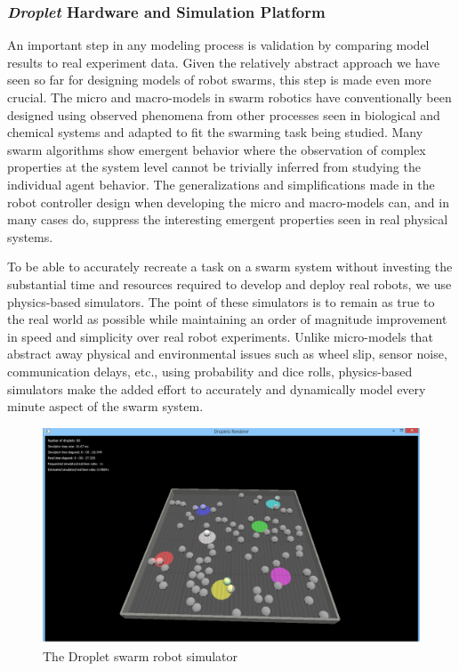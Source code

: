\documentclass[11pt, onecolumn, compsoc, letterpaper]{article}
\begin{document}
\subsubsection{\emph{Droplet} Hardware and Simulation Platform}
An important step in any modeling process is validation by comparing model results to real experiment data. Given the relatively abstract approach we have seen so far for designing models of robot swarms, this step is made even more crucial. The micro and macro-models in swarm robotics have conventionally been designed using observed phenomena from other processes seen in biological and chemical systems and adapted to fit the swarming task being studied. Many swarm algorithms show emergent behavior where the observation of complex properties at the system level cannot be trivially inferred from studying the individual agent behavior. The generalizations and simplifications made in the robot controller design when developing the micro and macro-models can, and in many cases do, suppress the interesting emergent properties seen in real physical systems. 

To be able to accurately recreate a task on a swarm system without investing the substantial time and resources required to develop and deploy real robots, we use physics-based simulators. The point of these simulators is to remain as true to the real world as possible while maintaining an order of magnitude improvement in speed and simplicity over real robot experiments. Unlike micro-models that abstract away physical and environmental issues such as wheel slip, sensor noise, communication delays, etc., using probability and dice rolls, physics-based simulators make the added effort to accurately and dynamically model every minute aspect of the swarm system.

\begin{figure}[!htb]
\centering\includegraphics[width=.75\textwidth]{../assets/dsim.png}
\centering\caption{The Droplet swarm robot simulator}\label{fig:dropletsim}
\end{figure}
\end{document}
